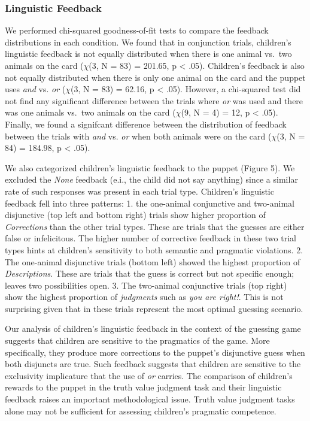 \documentclass[10pt, letterpaper]{article}
\begin{document}
\subsubsection{Linguistic Feedback}\label{linguistic-feedback}

We performed chi-squared goodness-of-fit tests to compare the feedback
distributions in each condition. We found that in conjunction trials,
children's linguistic feedback is not equally distributed when there is
one animal vs.~two animals on the card (\(\chi\)(3, N = 83) = 201.65, p
\textless{} .05). Children's feedback is also not equally distributed
when there is only one animal on the card and the puppet uses \emph{and}
vs. \emph{or} (\(\chi\)(3, N = 83) = 62.16, p \textless{} .05). However,
a chi-squared test did not find any significant difference between the
trials where \emph{or} was used and there was one animals vs.~two
animals on the card (\(\chi\)(9, N = 4) = 12, p \textless{} .05).
Finally, we found a signifcant difference between the distribution of
feedback between the trials with \emph{and} vs. \emph{or} when both
animals were on the card (\(\chi\)(3, N = 84) = 184.98, p \textless{}
.05).

We also categorized children's linguistic feedback to the puppet (Figure
5). We excluded the \emph{None} feedback (e.i., the child did not say
anything) since a similar rate of such responses was present in each
trial type. Children's linguistic feedback fell into three patterns: 1.
the one-animal conjunctive and two-animal disjunctive (top left and
bottom right) trials show higher proportion of \emph{Corrections} than
the other trial types. These are trials that the guesses are either
false or infelicitous. The higher number of corrective feedback in these
two trial types hints at children's sensitivity to both semantic and
pragmatic violations. 2. The one-animal disjunctive trials (bottom left)
showed the highest proportion of \emph{Descriptions}. These are trials
that the guess is correct but not specific enough; leaves two
possibilities open. 3. The two-animal conjunctive trials (top right)
show the highest proportion of \emph{judgments} such as \emph{you are
right!}. This is not surprising given that in these trials represent the
most optimal guessing scenario.

Our analysis of children's linguistic feedback in the context of the
guessing game suggests that children are sensitive to the pragmatics of
the game. More specifically, they produce more corrections to the
puppet's disjunctive guess when both disjuncts are true. Such feedback
suggests that children are sensitive to the exclusivity implicature that
the use of \emph{or} carries. The comparison of children's rewards to
the puppet in the truth value judgment task and their linguistic
feedback raises an important methodological issue. Truth value judgment
tasks alone may not be sufficient for assessing children's pragmatic
competence.
\end{document}
